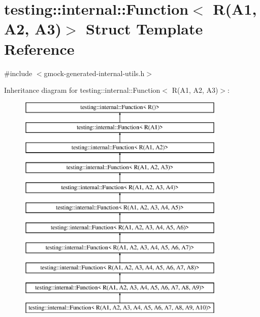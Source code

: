 \hypertarget{structtesting_1_1internal_1_1_function_3_01_r_07_a1_00_01_a2_00_01_a3_08_4}{}\section{testing\+::internal\+::Function$<$ R(A1, A2, A3)$>$ Struct Template Reference}
\label{structtesting_1_1internal_1_1_function_3_01_r_07_a1_00_01_a2_00_01_a3_08_4}


{\ttfamily \#include $<$gmock-\/generated-\/internal-\/utils.\+h$>$}

Inheritance diagram for testing\+::internal\+::Function$<$ R(A1, A2, A3)$>$\+:\begin{figure}[H]
\begin{center}
\leavevmode
\includegraphics[height=11.000000cm]{d6/d2d/structtesting_1_1internal_1_1_function_3_01_r_07_a1_00_01_a2_00_01_a3_08_4}
\end{center}
\end{figure}
